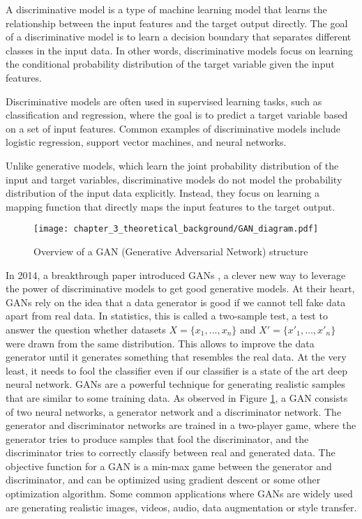 A discriminative model is a type of machine learning model that learns the relationship between the input features and the target output directly. The goal of a discriminative model is to learn a decision boundary that separates different classes in the input data. In other words, discriminative models focus on learning the conditional probability distribution of the target variable given the input features.

Discriminative models are often used in supervised learning tasks, such as classification and regression, where the goal is to predict a target variable based on a set of input features. Common examples of discriminative models include logistic regression, support vector machines, and neural networks.

Unlike generative models, which learn the joint probability distribution of the input and target variables, discriminative models do not model the probability distribution of the input data explicitly. Instead, they focus on learning a mapping function that directly maps the input features to the target output.

\begin{figure}[h]
	\centering
	\texttt{[image: chapter\_3\_theoretical\_background/GAN\_diagram.pdf]}
	\caption{Overview of a GAN (Generative Adversarial Network) structure}
	\label{fig:chapter_3_theoretical_background/GAN}
\end{figure}

In 2014, a breakthrough paper introduced \acfp{GAN} \cite{goodfellow2020generative}, a clever new way to leverage the power of discriminative models to get good generative models. At their heart, \acp{GAN} rely on the idea that a data generator is good if we cannot tell fake data apart from real data. In statistics, this is called a two-sample test, a test to answer the question whether datasets $X=\{x_1,\ldots, x_n\}$ and $X'=\{x'_1,\ldots, x'_n\}$ were drawn from the same distribution. This allows to improve the data generator until it generates something that resembles the real data. At the very least, it needs to fool the classifier even if our classifier is a state of the art deep neural network. \acp{GAN} are a powerful technique for generating realistic samples that are similar to some training data. As observed in Figure \ref{fig:chapter_3_theoretical_background/GAN}, a \ac{GAN} consists of two neural networks, a generator network and a discriminator network. The generator and discriminator networks are trained in a two-player game, where the generator tries to produce samples that fool the discriminator, and the discriminator tries to correctly classify between real and generated data. The objective function for a \ac{GAN} is a min-max game between the generator and discriminator, and can be optimized using gradient descent or some other optimization algorithm. Some common applications where \acp{GAN} are widely used are generating realistic images, videos, audio, data augmentation or style transfer.


